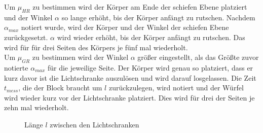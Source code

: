 Um $\mu_{HR}$ zu bestimmen wird der Körper am Ende der schiefen Ebene platziert und der Winkel $\alpha$ so lange erhöht, bis der Körper anfängt zu rutschen. Nachdem $\alpha_{max}$ notiert wurde, wird der Körper und der Winkel der schiefen Ebene zurückgesetzt. $\alpha$ wird wieder erhöht, bis der Körper anfängt zu rutschen. Das wird für für drei Seiten des Körpers je fünf mal wiederholt.\\
Um $\mu_{GR}$ zu bestimmen wird der Winkel $\alpha$ größer eingestellt, als das Größte zuvor notierte $\alpha_{max}$ für die jeweilige Seite. Der Körper wird genau so platziert, dass er kurz davor ist die Lichtschranke auszulösen und wird darauf losgelassen. Die Zeit $t_{mess}$, die der Block braucht um $l$ zurückzulegen, wird notiert und der Würfel wird wieder kurz vor der Lichtschranke platziert. Dies wird für drei der Seiten je zehn mal wiederholt.

\begin{figure}
    \centering
    
    \caption[Lichtschranken]{Länge $l$ zwischen den Lichtschranken}
    \label{fig:Lichtschranken}
\end{figure}